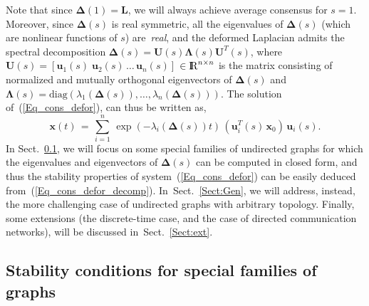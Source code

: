 \documentclass[letterpaper,9pt,twocolumn]{autart}
\newcommand{\rr}{\mathop{{\rm I}\mskip-4.0mu{\rm R}}\nolimits}
\newcommand{\vet}[1]{\ensuremath{{\mathbf #1}}}
\begin{document}
Note that since $\boldsymbol{\Delta}(1) = \vet{L}$, we will always achieve
average consensus for $s = 1$. Moreover, since $\boldsymbol{\Delta}(s)$ is real symmetric,
all the eigenvalues of $\boldsymbol{\Delta}(s)$ (which are nonlinear functions of $s$)
are~\emph{real}, and the deformed Laplacian admits
the spectral decomposition $\boldsymbol{\Delta}(s) = \vet{U}(s) \boldsymbol{\Lambda}(s)\vet{U}^T(s)$,
where $\vet{U}(s) = [\vet{u}_1(s)\;\vet{u}_2(s) \,\ldots\, \vet{u}_n(s)]$ $\in \rr^{n \times n}$ is the matrix
consisting of normalized and mutually orthogonal eigenvectors of
$\boldsymbol{\Delta}(s)$ and 
$\boldsymbol{\Lambda}(s) = \text{diag}(\lambda_1(\boldsymbol{\Delta}(s)),\ldots,\lambda_n(\boldsymbol{\Delta}(s)))$.
The solution of~(\ref{Eq_cons_defor}), can thus be written as, \begin{equation}\label{Eq_cons_defor_decomp}
\vet{x}(t) \,=\, \sum_{i=1}^n\, \exp(-\lambda_i(\boldsymbol{\Delta}(s))t)\,(\vet{u}_i^T(s)\,\vet{x}_0)\,\vet{u}_i(s).
\end{equation}
In Sect.~\ref{Sect:Spec}, we will focus on some special families of undirected graphs for
which the eigenvalues and eigenvectors of $\boldsymbol{\Delta}(s)$ can be
computed in closed form, and thus the stability properties of system~(\ref{Eq_cons_defor})
can be easily deduced from~(\ref{Eq_cons_defor_decomp}).
In~Sect.~\ref{Sect:Gen}, we will address, instead, the more challenging case
of undirected graphs with arbitrary topology. Finally, some extensions
(the discrete-time case, and the case of directed communication networks), will be discussed in~Sect.~\ref{Sect:ext}. 

\subsection{Stability conditions for special families of graphs}\label{Sect:Spec}
\end{document}
